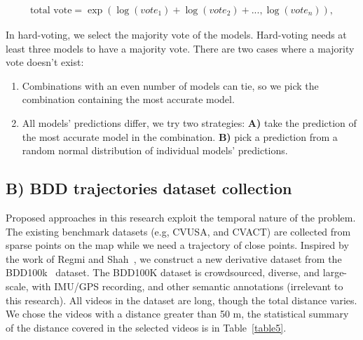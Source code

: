 \documentclass[10pt,letterpaper]{article}
\begin{document}
\begin{eqnarray}
\label{eq1}
\text{total vote} = \exp(\log(vote_1) + \log(vote_2) + ..., \log(vote_n)),
\end{eqnarray}

In hard-voting, we select the majority vote of the models. Hard-voting needs at least three models to have a majority vote. There are two cases where a majority vote doesn’t exist:
\begin{enumerate}
  \item Combinations with an even number of models can tie, so we pick the combination containing the most accurate model.
  \item All models’ predictions differ, we try two strategies: {\bf A)} take the prediction of the most accurate model in the combination. {\bf B)} pick a prediction from a random normal distribution of individual models' predictions.
\end{enumerate}

\subsection*{B) BDD trajectories dataset collection}
Proposed approaches in this research exploit the temporal nature of the problem. The existing benchmark datasets (e.g, CVUSA, and CVACT) are collected from sparse points on the map while we need a trajectory of close points. Inspired by the work of Regmi and Shah~\cite{bib24}, we construct a new derivative dataset from the BDD100k~\cite{bib12} dataset. The BDD100K dataset is crowdsourced, diverse, and large-scale, with IMU/GPS recording, and other semantic annotations (irrelevant to this research). All videos in the dataset are  long, though the total distance varies. We chose the videos with a distance greater than 50 m, the statistical summary of the distance covered in the selected videos is in Table~\ref{table5}.

\begin{table}[!ht]
  \centering
  \caption{
  {\bf A statistical summary of the distance covered in selected videos.}}
  \label{table5}
\end{table}
\end{document}
